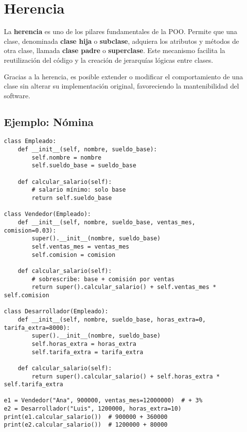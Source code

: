 \documentclass[12pt,a4paper]{article}
\begin{document}
\FloatBarrier

\section{Herencia}
La \textbf{herencia} es uno de los pilares fundamentales de la POO. Permite que una clase, denominada \textbf{clase hija} o \textbf{subclase}, adquiera los atributos y métodos de otra clase, llamada \textbf{clase padre} o \textbf{superclase}.  
Este mecanismo facilita la reutilización del código y la creación de jerarquías lógicas entre clases.

Gracias a la herencia, es posible extender o modificar el comportamiento de una clase sin alterar su implementación original, favoreciendo la mantenibilidad del software.

\subsection*{Ejemplo: Nómina}
\begin{lstlisting}
class Empleado:
    def __init__(self, nombre, sueldo_base):
        self.nombre = nombre
        self.sueldo_base = sueldo_base

    def calcular_salario(self):
        # salario mínimo: solo base
        return self.sueldo_base

class Vendedor(Empleado):
    def __init__(self, nombre, sueldo_base, ventas_mes, comision=0.03):
        super().__init__(nombre, sueldo_base)
        self.ventas_mes = ventas_mes
        self.comision = comision

    def calcular_salario(self):
        # sobrescribe: base + comisión por ventas
        return super().calcular_salario() + self.ventas_mes * self.comision

class Desarrollador(Empleado):
    def __init__(self, nombre, sueldo_base, horas_extra=0, tarifa_extra=8000):
        super().__init__(nombre, sueldo_base)
        self.horas_extra = horas_extra
        self.tarifa_extra = tarifa_extra

    def calcular_salario(self):
        return super().calcular_salario() + self.horas_extra * self.tarifa_extra

e1 = Vendedor("Ana", 900000, ventas_mes=12000000)  # + 3%
e2 = Desarrollador("Luis", 1200000, horas_extra=10)
print(e1.calcular_salario())  # 900000 + 360000
print(e2.calcular_salario())  # 1200000 + 80000
\end{lstlisting}
\end{document}

